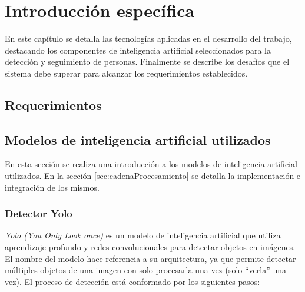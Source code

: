 \chapter{Introducción específica} %

\label{Chapter2}

En este capítulo se detalla las tecnologías aplicadas en el desarrollo del trabajo, destacando los componentes de inteligencia artificial seleccionados para la detección y seguimiento de personas. Finalmente se describe los desafíos que el sistema debe superar para alcanzar los requerimientos establecidos.


\section{Requerimientos}
\label{sec:requerimientos}

\newpage


\section{Modelos de inteligencia artificial utilizados}
\label{sec:modelosIA}

En esta sección se realiza una introducción a los modelos de inteligencia artificial utilizados. En la sección \ref{sec:cadenaProcesamiento} se detalla la implementación e integración de los mismos.

\subsection{Detector Yolo}

\textit{Yolo (You Only Look once)} es un modelo de inteligencia artificial que utiliza aprendizaje profundo y redes convolucionales para detectar objetos en imágenes. El nombre del modelo hace referencia a su arquitectura, ya que permite detectar múltiples objetos de una imagen con solo procesarla una vez (solo ``verla'' una vez). El proceso de detección está conformado por los siguientes pasos:

